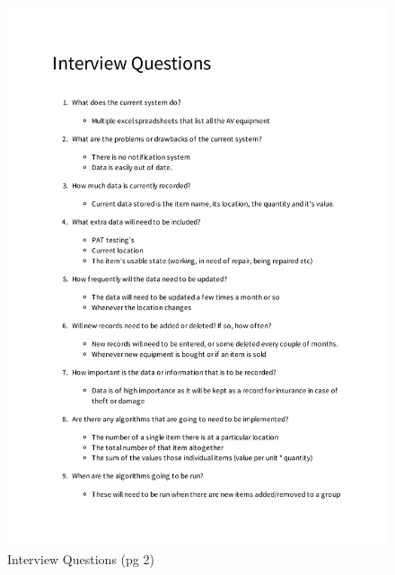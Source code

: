 \documentclass[12pt]{report}
\begin{document}
\begin{figure}[H]
    \caption{Interview Questions (pg 2)} \label{fig: Interview Questions}
    \includegraphics[page=2,width=\textwidth]{./Interview/interview_questions.pdf}
\end{figure}
\end{document}
